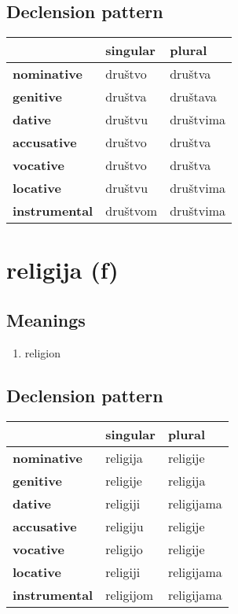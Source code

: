 \subsection*{Declension pattern}
\begin{tabularx}{\linewidth}{Xll}
\toprule
{} &  singular &     plural \\
\midrule
\textbf{nominative  } &   društvo &    društva \\
\textbf{genitive    } &   društva &   društava \\
\textbf{dative      } &   društvu &  društvima \\
\textbf{accusative  } &   društvo &    društva \\
\textbf{vocative    } &   društvo &    društva \\
\textbf{locative    } &   društvu &  društvima \\
\textbf{instrumental} &  društvom &  društvima \\
\bottomrule
\end{tabularx}

\filbreak
\section{religija (f)}
\subsection*{Meanings}
\begin{enumerate}
\item religion
\end{enumerate}
\subsection*{Declension pattern}
\begin{tabularx}{\linewidth}{Xll}
\toprule
{} &   singular &      plural \\
\midrule
\textbf{nominative  } &   religija &    religije \\
\textbf{genitive    } &   religije &    religija \\
\textbf{dative      } &   religiji &  religijama \\
\textbf{accusative  } &   religiju &    religije \\
\textbf{vocative    } &   religijo &    religije \\
\textbf{locative    } &   religiji &  religijama \\
\textbf{instrumental} &  religijom &  religijama \\
\bottomrule
\end{tabularx}

